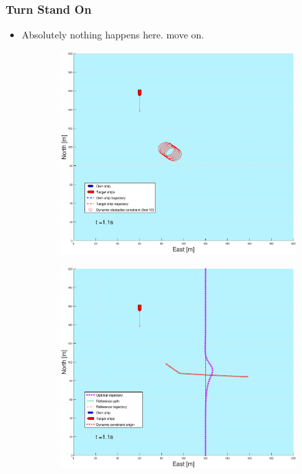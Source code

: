 \subsubsection{Turn Stand On}
\begin{itemize}
    \item Absolutely nothing happens here. move on.
\end{itemize}

\clearpage
\begin{figure}[!b] %
    \begin{subfigure}[b]{0.49\textwidth}
        \centering
        \includegraphics[width=\textwidth]{Images/Figures/sving_SO/_Simple_0fig1_time=1}
    \end{subfigure}
    \hfill
    \begin{subfigure}[b]{0.499\textwidth}
        \centering
        \includegraphics[width=\textwidth]{Images/Figures/sving_SO/_Simple_0fig999_time=1}

\end{subfigure}
\end{figure}
